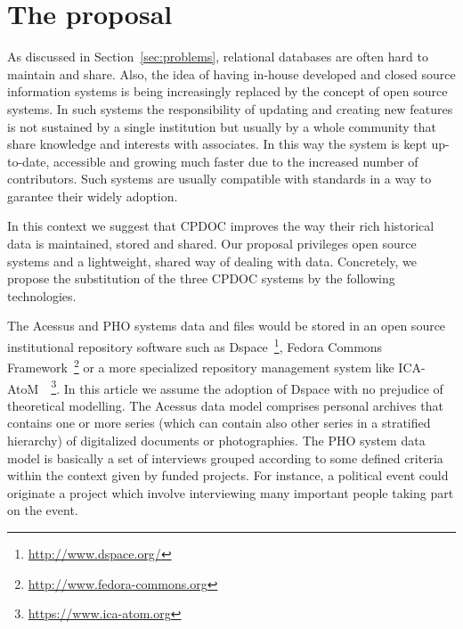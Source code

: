 \section{The proposal}\label{sec:proposal}

As discussed in Section~\ref{sec:problems}, relational databases are
often hard to maintain and share. Also, the idea of having in-house
developed and closed source information systems is being increasingly
replaced by the concept of open source systems. In such systems the
responsibility of updating and creating new features is not sustained
by a single institution but usually by a whole community that share
knowledge and interests with associates. In this way the system is
kept up-to-date, accessible and growing much faster due to the
increased number of contributors. Such systems are usually compatible
with standards in a way to garantee their widely adoption.

In this context we suggest that CPDOC improves the way their rich
historical data is maintained, stored and shared. Our proposal
privileges open source systems and a lightweight, shared way of
dealing with data. Concretely, we propose the substitution of the three CPDOC systems by
the following technologies.


The Acessus and PHO systems data and files would be stored in an open
source institutional repository software such as
Dspace~\footnote{\url{http://www.dspace.org/}}, Fedora Commons
Framework~\footnote{\url{http://www.fedora-commons.org}} or a more
specialized repository management system like
ICA-AtoM~\cite{van2009ica}~\footnote{\url{https://www.ica-atom.org}}. In
this article we assume the adoption of Dspace with no prejudice of
theoretical modelling. The Acessus data model comprises personal
archives that contains one or more series (which can contain also
other series in a stratified hierarchy) of digitalized documents or
photographies. The PHO system data model is basically a set of
interviews grouped according to some defined criteria within the
context given by funded projects. For instance, a political event
could originate a project which involve interviewing many important
people taking part on the event.

